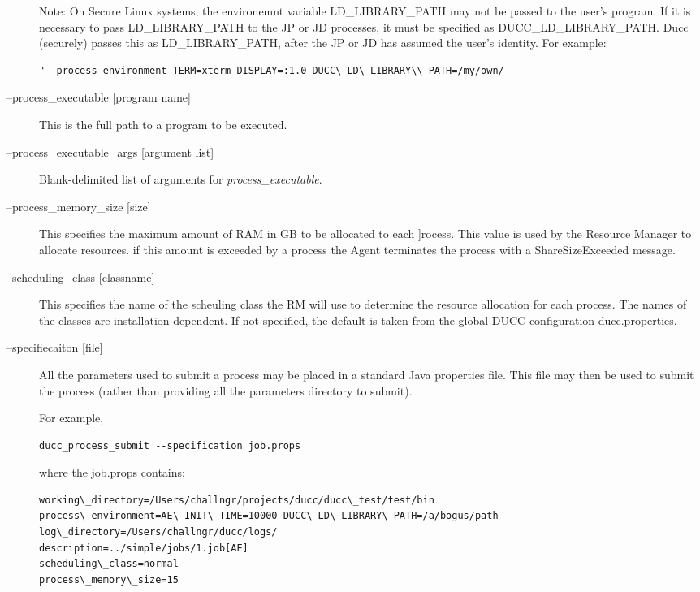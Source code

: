\begin{description}
          Note: On Secure Linux systems, the environemnt variable 
          LD\_LIBRARY\_PATH may not be passed to the user's program. If it is 
          necessary to pass LD\_LIBRARY\_PATH to the JP or JD processes, it must be 
          specified as DUCC\_LD\_LIBRARY\_PATH. Ducc (securely) passes this as 
          LD\_LIBRARY\_PATH, after the JP or JD has assumed the user's identity. For 
          example: 
          
\begin{verbatim}
"--process_environment TERM=xterm DISPLAY=:1.0 DUCC\_LD\_LIBRARY\\_PATH=/my/own/
\end{verbatim}

        \item[--process\_executable {[program name]}] This is the full path to a program to be
          executed.

        \item[--process\_executable\_args {[argument list]}] Blank-delimited list of arguments for
          {\em process\_executable}.

        \item[--process\_memory\_size {[size]} ] This specifies the maximum amount of RAM in GB to
          be allocated to each ]rocess.  This value is used by the Resource Manager to allocate
          resources. if this amount is exceeded by a process the Agent terminates the process with a
          ShareSizeExceeded message.

        \item[--scheduling\_class {[classname]} ] This specifies the name of the scheuling class the
          RM will use to determine the resource allocation for each process. The names of the
          classes are installation dependent. If not specified, the default is taken from the global
          DUCC configuration ducc.properties.

        \item[--specifiecaiton {[file]} ] All the parameters used to submit a process may be placed
          in a standard Java properties file.  This file may then be used to submit the process
          (rather than providing all the parameters directory to submit).
          
          For example, 
\begin{verbatim}
ducc_process_submit --specification job.props 
\end{verbatim}

          where the job.props contains: 
\begin{verbatim}
working\_directory=/Users/challngr/projects/ducc/ducc\_test/test/bin 
process\_environment=AE\_INIT\_TIME=10000 DUCC\_LD\_LIBRARY\_PATH=/a/bogus/path 
log\_directory=/Users/challngr/ducc/logs/ 
description=../simple/jobs/1.job[AE] 
scheduling\_class=normal 
process\_memory\_size=15 
\end{verbatim}


\end{description}
